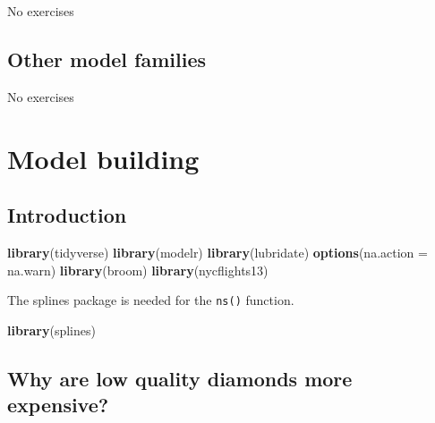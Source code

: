 \documentclass[]{book}
\newenvironment{Shaded}{\begin{snugshade}}{\end{snugshade}}
\newcommand{\DataTypeTok}[1]{\textcolor[rgb]{0.13,0.29,0.53}{#1}}
\newcommand{\KeywordTok}[1]{\textcolor[rgb]{0.13,0.29,0.53}{\textbf{#1}}}
\newcommand{\NormalTok}[1]{#1}
\theoremstyle{plain}
\theoremstyle{remark}
\begin{document}
No exercises

\hypertarget{other-model-families}{%
\section{Other model families}\label{other-model-families}}

No exercises

\hypertarget{model-building}{%
\chapter{Model building}\label{model-building}}

\hypertarget{introduction-15}{%
\section{Introduction}\label{introduction-15}}

\begin{Shaded}
\begin{Highlighting}[]
\KeywordTok{library}\NormalTok{(tidyverse)}
\KeywordTok{library}\NormalTok{(modelr)}
\KeywordTok{library}\NormalTok{(lubridate)}
\KeywordTok{options}\NormalTok{(}\DataTypeTok{na.action =}\NormalTok{ na.warn)}
\KeywordTok{library}\NormalTok{(broom)}
\KeywordTok{library}\NormalTok{(nycflights13)}
\end{Highlighting}
\end{Shaded}

The splines package is needed for the \texttt{ns()} function.

\begin{Shaded}
\begin{Highlighting}[]
\KeywordTok{library}\NormalTok{(splines)}
\end{Highlighting}
\end{Shaded}

\hypertarget{why-are-low-quality-diamonds-more-expensive}{%
\section{Why are low quality diamonds more expensive?}\label{why-are-low-quality-diamonds-more-expensive}}
\end{document}
